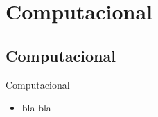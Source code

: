 \documentclass{beamer}
\begin{document}
\section{Computacional}

\subsection{Computacional}

\begin{frame}{Computacional}

\begin{itemize}
\item bla bla
\end{itemize}

\end{frame}
\end{document}
